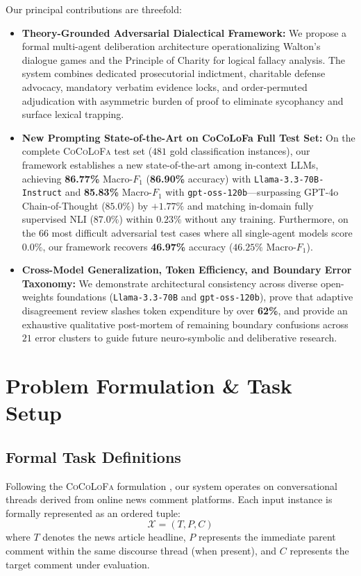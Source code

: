 \documentclass[11pt]{article}
\begin{document}
Our principal contributions are threefold:
\begin{itemize}[leftmargin=*,itemsep=2pt,topsep=3pt]
    \item \textbf{Theory-Grounded Adversarial Dialectical Framework:} We propose a formal multi-agent deliberation architecture operationalizing Walton's dialogue games and the Principle of Charity for logical fallacy analysis. The system combines dedicated prosecutorial indictment, charitable defense advocacy, mandatory verbatim evidence locks, and order-permuted adjudication with asymmetric burden of proof to eliminate sycophancy and surface lexical trapping.
    \item \textbf{New Prompting State-of-the-Art on CoCoLoFa Full Test Set:} On the complete \textsc{CoCoLoFa} test set ($481$ gold classification instances), our framework establishes a new state-of-the-art among in-context LLMs, achieving \textbf{86.77\%} Macro-$F_1$ (\textbf{86.90\%} accuracy) with \texttt{Llama-3.3-70B-Instruct} and \textbf{85.83\%} Macro-$F_1$ with \texttt{gpt-oss-120b}---surpassing GPT-4o Chain-of-Thought ($85.0\%$) by $+1.77\%$ and matching in-domain fully supervised NLI ($87.0\%$) within $0.23\%$ without any training. Furthermore, on the $66$ most difficult adversarial test cases where all single-agent models score $0.0\%$, our framework recovers \textbf{46.97\%} accuracy ($46.25\%$ Macro-$F_1$).
    \item \textbf{Cross-Model Generalization, Token Efficiency, and Boundary Error Taxonomy:} We demonstrate architectural consistency across diverse open-weights foundations (\texttt{Llama-3.3-70B} and \texttt{gpt-oss-120b}), prove that adaptive disagreement review slashes token expenditure by over \textbf{62\%}, and provide an exhaustive qualitative post-mortem of remaining boundary confusions across $21$ error clusters to guide future neuro-symbolic and deliberative research.
\end{itemize}

\section{Problem Formulation \& Task Setup}

\subsection{Formal Task Definitions}
Following the \textsc{CoCoLoFa} formulation \cite{cocolofa2024}, our system operates on conversational threads derived from online news comment platforms. Each input instance is formally represented as an ordered tuple:
\begin{equation}
    \mathcal{X} = (T, P, C)
\end{equation}
where $T$ denotes the news article headline, $P$ represents the immediate parent comment within the same discourse thread (when present), and $C$ represents the target comment under evaluation.
\end{document}
